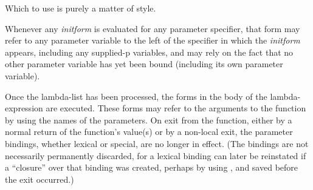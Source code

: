 Which to use is purely a matter of style.

Whenever any \emph{initform} is evaluated for any parameter
specifier, that form may refer to any parameter variable to the left of
the specifier in which the \emph{initform} appears, including any supplied-p
variables, and may rely on the fact that no other parameter variable
has yet been bound (including its own parameter variable).

Once the lambda-list has been processed, the forms in the body of the
lambda-expression are executed.  These forms may refer to the arguments
to the function by using the names of the parameters.  On exit from the
function, either by a normal return of the function's value(s) or by a
non-local exit, the parameter bindings, whether lexical or special, are
no longer in effect.  (The bindings are not necessarily permanently discarded,
for a lexical binding can later be reinstated if a
``closure'' over that binding was created,
perhaps by using , and saved before the exit occurred.)

